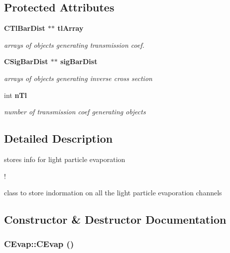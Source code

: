 \subsection*{Protected Attributes}
\begin{CompactItemize}
\item 
\bf{CTl\-Bar\-Dist} $\ast$$\ast$ \bf{tl\-Array}\label{classCEvap_cbc790b16a612d40ee0c5ef07bd6d979}

\begin{CompactList}\small\item\em arrays of objects generating transmission coef. \item\end{CompactList}\item 
\bf{CSig\-Bar\-Dist} $\ast$$\ast$ \bf{sig\-Bar\-Dist}\label{classCEvap_24f6bca6aa46e8827332806cd1f3a9e6}

\begin{CompactList}\small\item\em arrays of objects generating inverse cross section \item\end{CompactList}\item 
int \bf{n\-Tl}\label{classCEvap_eaa49009f3e2afb26b390690babc7d0f}

\begin{CompactList}\small\item\em number of transmission coef generating objects \item\end{CompactList}\end{CompactItemize}


\subsection{Detailed Description}
stores info for light particle evaporation 

!

class to store indormation on all the light particle evaporation channels 



\subsection{Constructor \& Destructor Documentation}
\subsubsection{\setlength{\rightskip}{0pt plus 5cm}CEvap::CEvap ()}\label{classCEvap_5e9710c313ea5ce45cdc50d09ac8e947}


